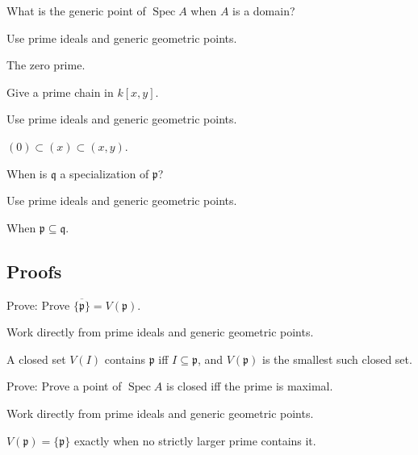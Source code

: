 \begin{exercise}\label{exr:vi06-expand-03}
What is the generic point of $\operatorname{Spec}A$ when $A$ is a domain?
\end{exercise}
\begin{hint}
Use prime ideals and generic geometric points.
\end{hint}
\begin{solution}
The zero prime.
\end{solution}

\begin{exercise}[Chain]\label{exr:vi06-expand-04}
Give a prime chain in $k[x,y]$.
\end{exercise}
\begin{hint}
Use prime ideals and generic geometric points.
\end{hint}
\begin{solution}
$(0)\subset(x)\subset(x,y)$.
\end{solution}

\begin{exercise}[Specialization]\label{exr:vi06-expand-05}
When is $\mathfrak q$ a specialization of $\mathfrak p$?
\end{exercise}
\begin{hint}
Use prime ideals and generic geometric points.
\end{hint}
\begin{solution}
When $\mathfrak p\subseteq\mathfrak q$.
\end{solution}

\subsection*{Proofs}

\begin{exercise}\label{exr:vi06-expand-06}
Prove: Prove $\overline{\{\mathfrak p\}}=V(\mathfrak p)$.
\end{exercise}
\begin{hint}
Work directly from prime ideals and generic geometric points.
\end{hint}
\begin{solution}
A closed set $V(I)$ contains $\mathfrak p$ iff $I\subseteq\mathfrak p$, and $V(\mathfrak p)$ is the smallest such closed set.
\end{solution}

\begin{exercise}\label{exr:vi06-expand-07}
Prove: Prove a point of $\operatorname{Spec}A$ is closed iff the prime is maximal.
\end{exercise}
\begin{hint}
Work directly from prime ideals and generic geometric points.
\end{hint}
\begin{solution}
$V(\mathfrak p)=\{\mathfrak p\}$ exactly when no strictly larger prime contains it.
\end{solution}

